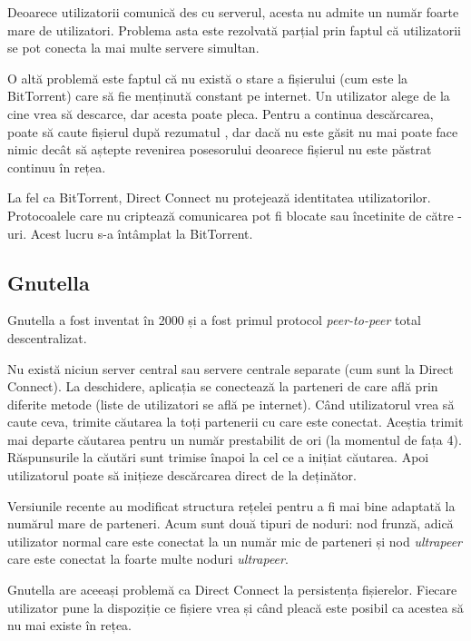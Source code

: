 \documentclass[a4wide,12pt]{report}
\newcommand{\eng}[1]{\emph{#1}} %
\newcommand{\acr}[1]{{\textsmaller[1]{\textsc{#1}}}} %
\begin{document}
Deoarece utilizatorii comunică des cu serverul, acesta nu admite un număr foarte mare de utilizatori. Problema asta este
rezolvată parțial prin faptul că utilizatorii se pot conecta la mai multe servere simultan.

O altă problemă este faptul că nu există o stare a fișierului (cum este la BitTorrent) care să fie menținută constant pe
internet. Un utilizator alege de la cine vrea să descarce, dar acesta poate pleca. Pentru a continua descărcarea, poate
să caute fișierul după rezumatul \acr{TTH}, dar dacă nu este găsit nu mai poate face nimic decât să aștepte revenirea
posesorului deoarece fișierul nu este păstrat continuu în rețea.

La fel ca BitTorrent, Direct Connect nu protejează identitatea utilizatorilor. Protocoalele care nu criptează
comunicarea pot fi blocate sau încetinite de către \acr{ISP}-uri. Acest lucru s-a întâmplat la BitTorrent\cite{torrblk}.

\subsection{Gnutella} %

Gnutella a fost inventat în 2000 și a fost primul protocol \eng{peer-to-peer} total
descentralizat.\cite{gnut1}\cite{gnut2}

Nu există niciun server central sau servere centrale separate (cum sunt la Direct Connect). La deschidere, aplicația se
conectează la parteneri de care află prin diferite metode (liste de utilizatori se află pe internet). Când
utilizatorul vrea să caute ceva, trimite căutarea la toți partenerii cu care este conectat. Aceștia trimit mai departe
căutarea pentru un număr prestabilit de ori (la momentul de fața 4). Răspunsurile la căutări sunt trimise înapoi la cel
ce a inițiat căutarea. Apoi utilizatorul poate să inițieze descărcarea direct de la deținător.

Versiunile recente au modificat structura rețelei pentru a fi mai bine adaptată la numărul mare de parteneri. Acum
sunt două tipuri de noduri: nod frunză, adică utilizator normal care este conectat la un număr mic de parteneri
și nod \eng{ultrapeer} care este conectat la foarte multe noduri \eng{ultrapeer}.

Gnutella are aceeași problemă ca Direct Connect la persistența fișierelor. Fiecare utilizator pune la dispoziție ce
fișiere vrea și când pleacă este posibil ca acestea să nu mai existe în rețea.
\end{document}
